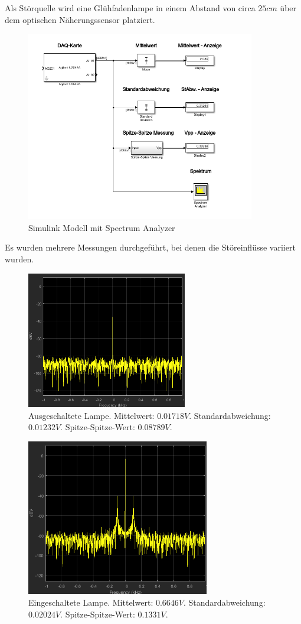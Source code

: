\documentclass[a4paper,12pt]{article}
\begin{document}
	Als Störquelle wird eine Glühfadenlampe in einem Abstand von circa $25cm$ über dem optischen Näherungssensor platziert.
	\begin{figure}[h]
		\centering
		\includegraphics[width=10cm]{assets/rauschen-spektrum}
		\caption{Simulink Modell mit Spectrum Analyzer}
	\end{figure}
	\newpage
	\noindent
	Es wurden mehrere Messungen durchgeführt, bei denen die Störeinflüsse variiert wurden.
	\begin{figure}[H]
		\centering
		\includegraphics[width=7cm]{assets/lampe-aus}
		\caption{Ausgeschaltete Lampe. Mittelwert: $0.01718V$. Standardabweichung: $0.01232V$. Spitze-Spitze-Wert: $0.08789V$.}
	\end{figure}
	\begin{figure}[H]
		\centering
		\includegraphics[width=8cm]{assets/lampe-an}
		\caption{Eingeschaltete Lampe. Mittelwert: $0.6646V$. Standardabweichung: $0.02024V$. Spitze-Spitze-Wert: $0.1331V$.}
	\end{figure}
\end{document}
